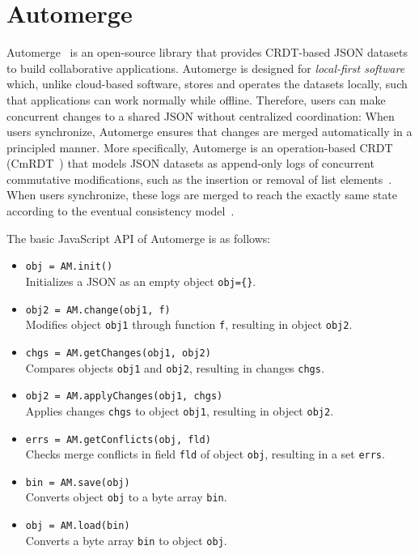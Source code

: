 \documentclass[12pt]{article}
\newcommand{\code}[1]  {\texttt{\footnotesize{#1}}}
\begin{document}
\section{Automerge}
\label{sec.automerge}

Automerge~\cite{kleppmann2018automerge} is an open-source library that provides
CRDT-based JSON datasets to build collaborative applications.
%
Automerge is designed for \emph{local-first software}~\cite{p2p.local} which,
unlike cloud-based software, stores and operates the datasets locally, such
that applications can work normally while offline.
%
Therefore, users can make concurrent changes to a shared JSON without
centralized coordination:
When users synchronize, Automerge ensures that changes are merged automatically
in a principled manner.
%
More specifically, Automerge is an operation-based CRDT
(CmRDT~\cite{p2p.crdts}) that models JSON datasets as append-only logs of
concurrent commutative modifications, such as the insertion or removal of list
elements~\cite{kleppmann2017conflict}.
%
When users synchronize, these logs are merged to reach the exactly same state
according to the eventual consistency model~\cite{p2p.sec}.

The basic JavaScript API of Automerge is as follows:

\begin{itemize}
\item \code{obj = AM.init()} \\
    Initializes a JSON as an empty object \code{obj=\{\}}.
\item \code{obj2 = AM.change(obj1, f)} \\
    Modifies object \code{obj1} through function \code{f}, resulting in
    object \code{obj2}.
\item \code{chgs = AM.getChanges(obj1, obj2)} \\
    Compares objects \code{obj1} and \code{obj2}, resulting in changes
    \code{chgs}.
\item \code{obj2 = AM.applyChanges(obj1, chgs)} \\
    Applies changes \code{chgs} to object \code{obj1}, resulting in object
    \code{obj2}.
\item \code{errs = AM.getConflicts(obj, fld)} \\
    Checks merge conflicts in field \code{fld} of object \code{obj}, resulting
    in a set \code{errs}.
\item \code{bin = AM.save(obj)} \\
    Converts object \code{obj} to a byte array \code{bin}.
\item \code{obj = AM.load(bin)} \\
    Converts a byte array \code{bin} to object \code{obj}.
\end{itemize}
\end{document}
